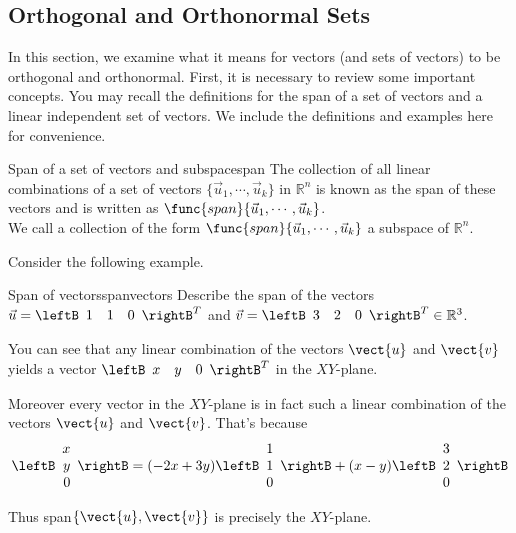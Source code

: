 \subsection{Orthogonal and Orthonormal Sets}

In this section, we examine what it means for vectors (and sets of
vectors) to be orthogonal and orthonormal. First, it is necessary to
review some important concepts. You may recall the definitions for the
span of a set of vectors and a linear independent set of vectors. We
include the definitions and examples here for convenience.

\begin{definition}{Span of a set of vectors and subspace}{span}
The collection of all linear combinations of a set of vectors $\{ \vec{u}_1,
\cdots ,\vec{u}_k\}$ in $\mathbb{R}^{n}$ is known as the span of these
vectors and is written as $\func{span} \{\vec{u}_1, \cdots ,
\vec{u}_k\}$. \\ 
We call a collection of the form $\func{span} \{\vec{u}_1, \cdots , \vec{u}_k\}$ 
a subspace of $\mathbb{R}^{n}$.
\end{definition}

Consider the following example. 

\begin{example}{Span of vectors}{spanvectors}
Describe the span of the vectors $\vec{u}=\leftB 
\begin{array}{rrr}
1  & 1 & 0
\end{array}
\rightB^T$ and
$\vec{v}=\leftB 
\begin{array}{rrr}
3  & 2 & 0
\end{array}
\rightB^T \in \mathbb{R}^{3}$.
\end{example}

\begin{solution}
You can see that any linear combination of the vectors $\vect{u}$ and $\vect{v}$ yields a vector 
$\leftB 
\begin{array}{rrr}
x  & y & 0
\end{array}
\rightB^T$ in the $XY$-plane. 

Moreover every vector in the $XY$-plane is in fact such a linear
combination of the vectors $\vect{u}$ and $\vect{v}$. That's because
\[ \leftB 
\begin{array}{r}
x \\
y \\
0
\end{array}
\rightB 
=
(-2x+3y) \leftB 
\begin{array}{r}
1 \\
1 \\
0
\end{array}
\rightB
+
(x-y)\leftB 
\begin{array}{r}
3 \\
2 \\
0
\end{array}
\rightB 
\]

Thus  span$\{\vect{u},\vect{v}\}$ is precisely the $XY$-plane.
\end{solution}

